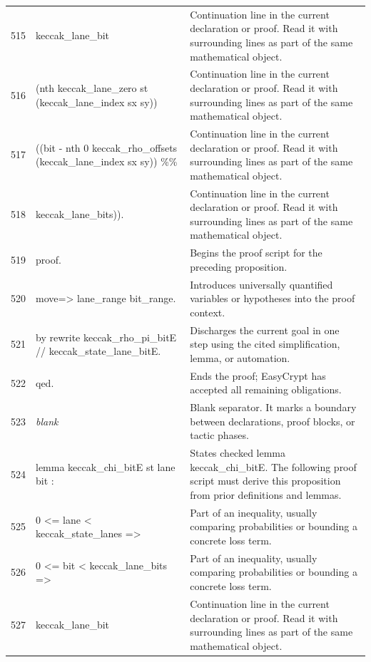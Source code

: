 \documentclass[10pt]{article}
\begin{document}
\begin{longtable}{r L{0.53\textwidth} L{0.37\textwidth}}
515 & {\ttfamily\scriptsize    keccak\_lane\_bit} & Continuation line in the current declaration or proof.  Read it with surrounding lines as part of the same mathematical object. \\
516 & {\ttfamily\scriptsize      (nth keccak\_lane\_zero st (keccak\_lane\_index sx sy))} & Continuation line in the current declaration or proof.  Read it with surrounding lines as part of the same mathematical object. \\
517 & {\ttfamily\scriptsize      ((bit - nth 0 keccak\_rho\_offsets (keccak\_lane\_index sx sy)) \%\%} & Continuation line in the current declaration or proof.  Read it with surrounding lines as part of the same mathematical object. \\
518 & {\ttfamily\scriptsize       keccak\_lane\_bits)).} & Continuation line in the current declaration or proof.  Read it with surrounding lines as part of the same mathematical object. \\
519 & {\ttfamily\scriptsize proof.} & Begins the proof script for the preceding proposition. \\
520 & {\ttfamily\scriptsize move=> lane\_range bit\_range.} & Introduces universally quantified variables or hypotheses into the proof context. \\
521 & {\ttfamily\scriptsize by rewrite keccak\_rho\_pi\_bitE // keccak\_state\_lane\_bitE.} & Discharges the current goal in one step using the cited simplification, lemma, or automation. \\
522 & {\ttfamily\scriptsize qed.} & Ends the proof; EasyCrypt has accepted all remaining obligations. \\
523 & {\ttfamily\scriptsize \emph{blank}} & Blank separator.  It marks a boundary between declarations, proof blocks, or tactic phases. \\
524 & {\ttfamily\scriptsize lemma keccak\_chi\_bitE st lane bit :} & States checked lemma keccak\_chi\_bitE.  The following proof script must derive this proposition from prior definitions and lemmas. \\
525 & {\ttfamily\scriptsize   0 <= lane < keccak\_state\_lanes =>} & Part of an inequality, usually comparing probabilities or bounding a concrete loss term. \\
526 & {\ttfamily\scriptsize   0 <= bit < keccak\_lane\_bits =>} & Part of an inequality, usually comparing probabilities or bounding a concrete loss term. \\
527 & {\ttfamily\scriptsize   keccak\_lane\_bit} & Continuation line in the current declaration or proof.  Read it with surrounding lines as part of the same mathematical object. \\

\end{longtable}
\end{document}
